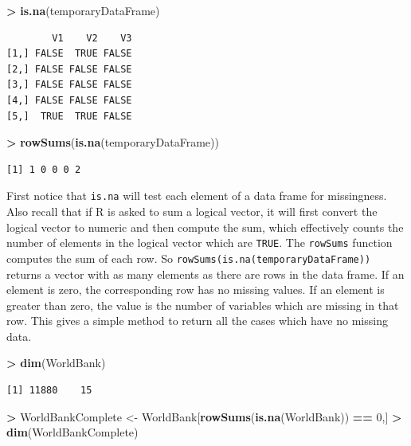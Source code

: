\documentclass[]{krantz}
\makeatletter
\newenvironment{Shaded}{\begin{snugshade}}{\end{snugshade}}
\newcommand{\KeywordTok}[1]{\textcolor[rgb]{0.27,0.27,0.27}{\textbf{#1}}}
\newcommand{\DecValTok}[1]{\textcolor[rgb]{0.06,0.06,0.06}{#1}}
\newcommand{\StringTok}[1]{\textcolor[rgb]{0.5,0.5,0.5}{#1}}
\newcommand{\OperatorTok}[1]{\textcolor[rgb]{0.43,0.43,0.43}{\textbf{#1}}}
\newcommand{\NormalTok}[1]{#1}
\newenvironment{kframe}{%
\medskip{}
\setlength{\fboxsep}{.8em}
 \def\at@end@of@kframe{}%
 \ifinner\ifhmode%
  \def\at@end@of@kframe{\end{minipage}}%
  \begin{minipage}{\columnwidth}%
 \fi\fi%
 \def\FrameCommand##1{\hskip\@totalleftmargin \hskip-\fboxsep
 \colorbox{shadecolor}{##1}\hskip-\fboxsep
     \hskip-\linewidth \hskip-\@totalleftmargin \hskip\columnwidth}%
 \MakeFramed {\advance\hsize-\width
   \@totalleftmargin\z@ \linewidth\hsize
   \@setminipage}}%
 {\par\unskip\endMakeFramed%
 \at@end@of@kframe}
\renewenvironment{Shaded}{\begin{kframe}}{\end{kframe}}
\makeatother
\begin{document}
\begin{Shaded}
\begin{Highlighting}[]
\OperatorTok{>}\StringTok{ }\KeywordTok{is.na}\NormalTok{(temporaryDataFrame)}
\end{Highlighting}
\end{Shaded}

\begin{verbatim}
        V1    V2    V3
[1,] FALSE  TRUE FALSE
[2,] FALSE FALSE FALSE
[3,] FALSE FALSE FALSE
[4,] FALSE FALSE FALSE
[5,]  TRUE  TRUE FALSE
\end{verbatim}

\begin{Shaded}
\begin{Highlighting}[]
\OperatorTok{>}\StringTok{ }\KeywordTok{rowSums}\NormalTok{(}\KeywordTok{is.na}\NormalTok{(temporaryDataFrame))}
\end{Highlighting}
\end{Shaded}

\begin{verbatim}
[1] 1 0 0 0 2
\end{verbatim}

First notice that \texttt{is.na} will test each element of a data frame
for missingness. Also recall that if R is asked to sum a logical vector,
it will first convert the logical vector to numeric and then compute the
sum, which effectively counts the number of elements in the logical
vector which are \texttt{TRUE}. The \texttt{rowSums} function computes
the sum of each row. So \texttt{rowSums(is.na(temporaryDataFrame))}
returns a vector with as many elements as there are rows in the data
frame. If an element is zero, the corresponding row has no missing
values. If an element is greater than zero, the value is the number of
variables which are missing in that row. This gives a simple method to
return all the cases which have no missing data.

\begin{Shaded}
\begin{Highlighting}[]
\OperatorTok{>}\StringTok{ }\KeywordTok{dim}\NormalTok{(WorldBank)}
\end{Highlighting}
\end{Shaded}

\begin{verbatim}
[1] 11880    15
\end{verbatim}

\begin{Shaded}
\begin{Highlighting}[]
\OperatorTok{>}\StringTok{ }\NormalTok{WorldBankComplete <-}\StringTok{ }\NormalTok{WorldBank[}\KeywordTok{rowSums}\NormalTok{(}\KeywordTok{is.na}\NormalTok{(WorldBank)) }\OperatorTok{==}\StringTok{ }\DecValTok{0}\NormalTok{,]}
\OperatorTok{>}\StringTok{ }\KeywordTok{dim}\NormalTok{(WorldBankComplete)}
\end{Highlighting}
\end{Shaded}
\end{document}
